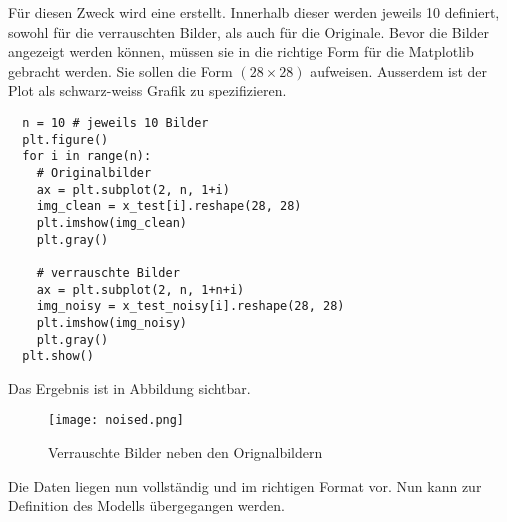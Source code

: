 \para{}
Für diesen Zweck wird eine  erstellt. Innerhalb dieser
werden jeweils 10  definiert, sowohl für die verrauschten Bilder, als
auch für die Originale.
Bevor die Bilder angezeigt werden können, müssen sie in die richtige Form für
die Matplotlib gebracht werden. Sie sollen die Form $(28 \times 28)$ aufweisen.
Ausserdem ist der Plot als schwarz-weiss Grafik zu spezifizieren.
\begin{verbatim}
  n = 10 # jeweils 10 Bilder
  plt.figure()
  for i in range(n):
    # Originalbilder
    ax = plt.subplot(2, n, 1+i)
    img_clean = x_test[i].reshape(28, 28)
    plt.imshow(img_clean)
    plt.gray()

    # verrauschte Bilder
    ax = plt.subplot(2, n, 1+n+i)
    img_noisy = x_test_noisy[i].reshape(28, 28)
    plt.imshow(img_noisy)
    plt.gray()
  plt.show()
\end{verbatim}

Das Ergebnis ist in Abbildung  sichtbar.
\begin{figure}[h!]
  \centering
  \texttt{[image: noised.png]}
  \caption{Verrauschte Bilder neben den Orignalbildern}
  \label{fig:noisy_clean_mnist}
\end{figure}
\para{}
Die Daten liegen nun vollständig und im richtigen Format vor.
Nun kann zur Definition des Modells übergegangen werden.

